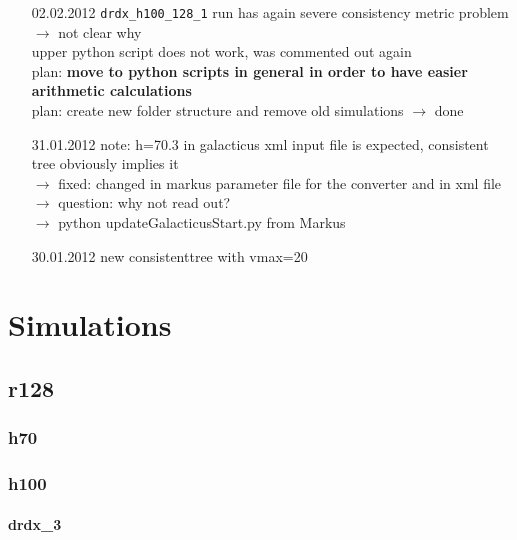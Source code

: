 \documentclass[a4paper,11pt,fleqn,oneside]{book}
\begin{document}
\begin{itemize}
\item[02.02.2012]
\texttt{drdx\_h100\_128\_1} run has again severe consistency 
metric problem \\ $\rightarrow$ not clear why \\
upper python script does not work, was commented out again \\
plan: \textbf{move to python scripts in general in order to have
 easier arithmetic calculations} \\   
plan: create new folder structure and remove old simulations $\rightarrow$ done \\

\item[31.01.2012]
note: h=70.3 in galacticus xml input file is expected, consistent tree obviously implies it \\
$\rightarrow$ fixed: changed in markus parameter file for the converter and in xml file \\
$\rightarrow$ question: why not read out? \\
$\rightarrow$ python updateGalacticusStart.py from Markus 

\item[30.01.2012]
new consistenttree with vmax=20



\end{itemize}

\chapter{Simulations} %

\section{r128} %

\subsection{h70} %

\newpage
\subsection{h100} %

\subsubsection{drdx\_3} 
\end{document}
